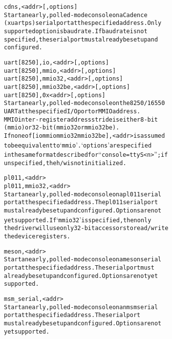 \documentclass[a4paper,8pt,english]{sphinxmanual}
\begin{document}
\begin{alltt}
                cdns,\textless{}addr\textgreater{}{[},options{]}
                        Start an early, polled-mode console on a Cadence
                        (xuartps) serial port at the specified address. Only
                        supported option is baud rate. If baud rate is not
                        specified, the serial port must already be setup and
                        configured.

                uart{[}8250{]},io,\textless{}addr\textgreater{}{[},options{]}
                uart{[}8250{]},mmio,\textless{}addr\textgreater{}{[},options{]}
                uart{[}8250{]},mmio32,\textless{}addr\textgreater{}{[},options{]}
                uart{[}8250{]},mmio32be,\textless{}addr\textgreater{}{[},options{]}
                uart{[}8250{]},0x\textless{}addr\textgreater{}{[},options{]}
                        Start an early, polled-mode console on the 8250/16550
                        UART at the specified I/O port or MMIO address.
                        MMIO inter-register address stride is either 8-bit
                        (mmio) or 32-bit (mmio32 or mmio32be).
                        If none of {[}io\textbar{}mmio\textbar{}mmio32\textbar{}mmio32be{]}, \textless{}addr\textgreater{} is assumed
                        to be equivalent to `mmio'. `options' are specified
                        in the same format described for ``console=ttyS\textless{}n\textgreater{}''; if
                        unspecified, the h/w is not initialized.

                pl011,\textless{}addr\textgreater{}
                pl011,mmio32,\textless{}addr\textgreater{}
                        Start an early, polled-mode console on a pl011 serial
                        port at the specified address. The pl011 serial port
                        must already be setup and configured. Options are not
                        yet supported.  If `mmio32' is specified, then only
                        the driver will use only 32-bit accessors to read/write
                        the device registers.

                meson,\textless{}addr\textgreater{}
                        Start an early, polled-mode console on a meson serial
                        port at the specified address. The serial port must
                        already be setup and configured. Options are not yet
                        supported.

                msm\_serial,\textless{}addr\textgreater{}
                        Start an early, polled-mode console on an msm serial
                        port at the specified address. The serial port
                        must already be setup and configured. Options are not
                        yet supported.


\end{alltt}
\end{document}
